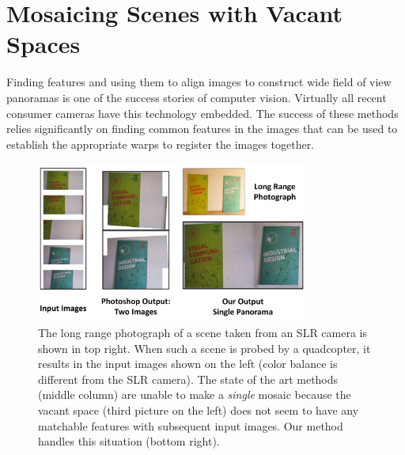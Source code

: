 \chapter{Mosaicing Scenes with  Vacant Spaces}
\label{ch:vacantSpaces}
Finding features and using them to align images to construct wide
field of view panoramas is one of the success stories of computer
vision.  Virtually all recent consumer cameras have this technology
embedded.  The success of these methods relies significantly on
finding common features in the images that can be used to establish
the appropriate warps to register the images together.

\begin{figure}
  \centering
  \includegraphics[width=0.8\textwidth]{figures/teaser.pdf}
  \caption[Overview]{ \label{fig:teaser} The long range photograph of a scene
    taken from an SLR camera is shown in top right.  When such a scene
    is probed by a quadcopter, it results in the input images shown on
    the left (color balance is different from the SLR camera).  The
    state of the art methods (middle column) are unable to make a
    \emph{single} mosaic because the vacant space (third picture on
    the left) does not seem to have any matchable features with
    subsequent input images. Our method handles this situation (bottom
    right).  }
\end{figure}

